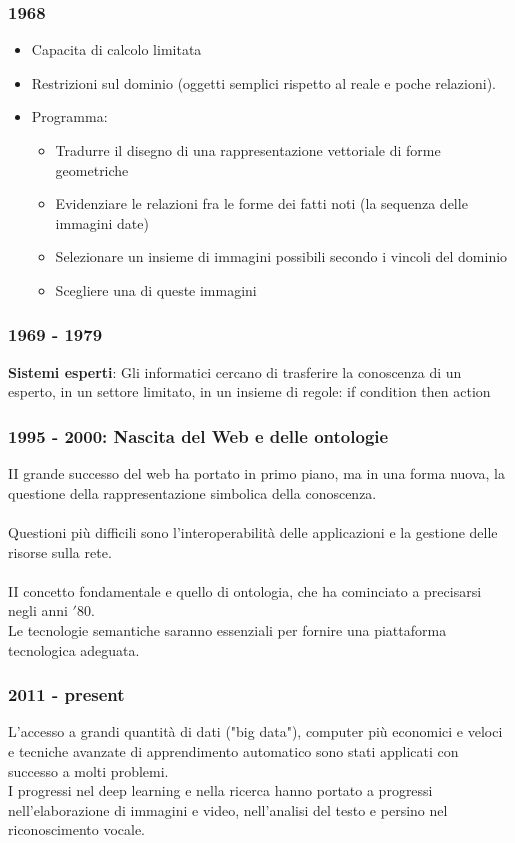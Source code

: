 \documentclass[../main.tex]{subfiles}
\begin{document}
	\subsubsection{1968}
	\begin{itemize}
		\item Capacita di calcolo limitata 
		\item Restrizioni sul dominio (oggetti semplici rispetto al reale e poche relazioni).
		\item Programma:
		\begin{itemize}
			\item Tradurre il disegno di una rappresentazione vettoriale di forme geometriche 
			\item Evidenziare le relazioni fra le forme dei fatti noti (la sequenza delle immagini date) 
			\item Selezionare un insieme di immagini possibili secondo i vincoli del dominio 
			\item Scegliere una di queste immagini
		\end{itemize}
	\end{itemize}
	\subsubsection{1969 - 1979}
	\textbf{Sistemi esperti}: Gli informatici cercano di trasferire la conoscenza di un esperto, in un settore limitato, in un insieme di regole: if condition then action
	\subsubsection{1995 - 2000: Nascita del Web e delle ontologie}
	II grande successo del web ha portato in primo piano, ma in una forma nuova, la questione della rappresentazione simbolica della conoscenza.\\ \\
	Questioni più difficili sono l'interoperabilità delle applicazioni e la gestione delle risorse sulla rete.\\ \\
	II concetto fondamentale e quello di ontologia, che ha cominciato a precisarsi negli anni $'80$.\\
	 Le tecnologie semantiche saranno essenziali per fornire una piattaforma tecnologica adeguata.
	\subsubsection{2011 - present}
	L'accesso a grandi quantità di dati ("big data"), computer più economici e veloci e tecniche avanzate di apprendimento automatico sono stati applicati con successo a molti problemi.\\
	I progressi nel deep learning e nella ricerca hanno portato a progressi nell'elaborazione di immagini e video, nell'analisi del testo e persino nel riconoscimento vocale.
\end{document}
